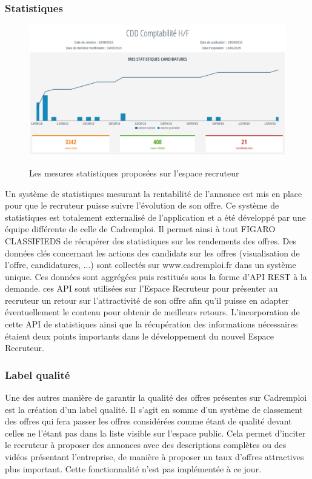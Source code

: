 \subsubsection{Statistiques}
\label{subs:Statistiques}
\begin{figure}[h]
  \begin{center}
    \hspace*{-1in}
    \includegraphics[width=1.2\textwidth]{Pictures/stats.png}
    \label{pic:suivi client backoffice}
    \caption{Les mesures statistiques proposées sur l'espace recruteur}
  \end{center}
\end{figure}
Un système de statistiques mesurant la rentabilité de l'annonce est mis en place pour que le recruteur puisse suivre l'évolution de son offre.
Ce système de statistiques est totalement externalisé de l'application et a été développé par une équipe différente de celle de Cadremploi.
Il permet ainsi à tout FIGARO CLASSIFIEDS de récupérer des statistiques sur les rendements des offres.
Des données clés concernant les actions des candidats sur les offres (visualisation de l'offre, candidatures, ...) sont collectés sur www.cadremploi.fr dans un système unique.
Ces données sont aggrégées puis restitués sous la forme d'API REST à la demande.
ces API sont utilisées sur l'Espace Recruteur pour présenter au recruteur un retour sur l'attractivité de son offre afin qu'il puisse en adapter éventuellement le contenu pour obtenir de meilleurs retours.
L'incorporation de cette API de statistiques ainsi que la récupération des informations nécessaires étaient deux points importants dans le développement du nouvel Espace Recruteur.
\subsubsection{Label qualité}
\label{subs:Label qualité}
Une des autres manière de garantir la qualité des offres présentes sur Cadremploi est la création d'un label qualité.
Il s'agit en somme d'un système de classement des offres qui fera passer les offres considérées comme étant de qualité devant celles ne l'étant pas dans la liste visible sur l'espace public.
Cela permet d'inciter le recruteur à proposer des annonces avec des descriptions complètes ou des vidéos présentant l'entreprise, de manière à proposer un taux d'offres attractives plus important.
Cette fonctionnalité n'est pas implémentée à ce jour.

